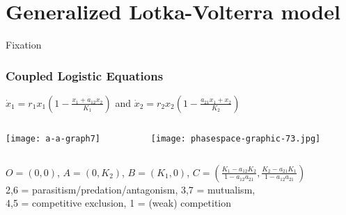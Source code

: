 \documentclass{beamer}
\begin{document}
\section[Fixation]{Generalized Lotka-Volterra model}

\begin{frame}
\centering
{{\Huge Fixation}}
\end{frame}


\begin{frame}
\frametitle{Coupled Logistic Equations}
\centering
$\dot{x}_1 = r_1 x_1 \left( 1 - \frac{x_1 + a_{12} x_2}{K_1} \right)$ and $\dot{x}_2 = r_2 x_2 \left( 1 - \frac{a_{21} x_1 + x_2}{K_2} \right)$
\begin{columns}
	\begin{column}{5cm}
		\begin{center}
			\texttt{[image: a-a-graph7]}
		\end{center}
	\end{column}
	\begin{column}{6cm}
		\begin{center}
			\texttt{[image: phasespace-graphic-73.jpg]}
		\end{center}
	\end{column}
\end{columns}
\footnotesize{
$O = (0,0)$, $A = (0,K_2)$, $B = (K_1,0)$, $C = (\frac{K_1-a_{12} K_2}{1-a_{12}a_{21}},\frac{K_2-a_{21} K_1}{1-a_{12}a_{21}})$ \\
2,6 = parasitism/predation/antagonism, 3,7 = mutualism, \\
4,5 = competitive exclusion, 1 = (weak) competition
}
\end{frame}
\end{document}
